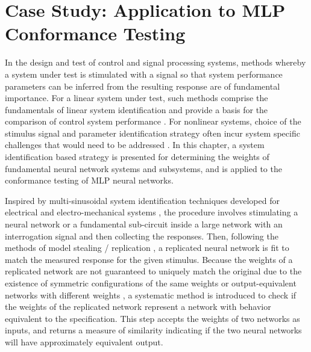 \chapter{Case Study: Application to MLP Conformance Testing}

\label{chapter_network_replication}

{I}{n} the design and test of control and signal processing systems, methods whereby a system under test is stimulated with a signal so that system performance parameters can be inferred from the resulting response are of fundamental importance.  For a linear system under test, such methods comprise the fundamentals of linear system identification and provide a basis for the comparison of control system performance \cite{ogata_modern_control}.  For nonlinear systems, choice of the stimulus signal and parameter identification strategy often incur system specific challenges that would need to be addressed \cite{aguirre_birds_2019}.  In this chapter, a system identification based strategy is presented for determining the weights of fundamental neural network systems and subsystems, and is applied to the conformance testing of MLP neural networks.

Inspired by multi-sinusoidal system identification techniques developed for electrical and electro-mechanical systems \cite{wambacq_distortion_1998,novak_nonlinear_2010,myslinski_large_signal_2005,schreurs_multisine_2003,schreurs_rf_2003,witters_black_box_2009}, the procedure involves stimulating a neural network or a fundamental sub-circuit inside a large network with an interrogation signal and then collecting the responses.  Then, following the methods of model stealing / replication \cite{tramer_stealing_2016,papernot_practical_2017,oh_reverse_2019,duddu_stealing_2018,orekondy_knockoff_2019}, a replicated neural network is fit to match the measured response for the given stimulus.  Because the weights of a replicated network are not guaranteed to uniquely match the original due to the existence of symmetric configurations of the same weights \cite{sussmann_uniqueness_1992,albertini_uniqueness_1993} or output-equivalent networks with different weights \cite{dimattina_how_2010}, a systematic method is introduced to check if the weights of the replicated network represent a network with behavior equivalent to the specification.  This step accepts the weights of two networks as inputs, and returns a measure of similarity indicating if the two neural networks will have approximately equivalent output.

